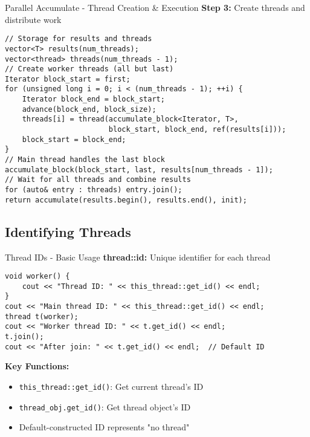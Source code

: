 \begin{frame}[fragile]{Parallel Accumulate - Thread Creation \& Execution}
	\textbf{Step 3:} Create threads and distribute work

	\begin{verbatim}
// Storage for results and threads
vector<T> results(num_threads);
vector<thread> threads(num_threads - 1);
// Create worker threads (all but last)
Iterator block_start = first;
for (unsigned long i = 0; i < (num_threads - 1); ++i) {
    Iterator block_end = block_start;
    advance(block_end, block_size);
    threads[i] = thread(accumulate_block<Iterator, T>,
                        block_start, block_end, ref(results[i]));
    block_start = block_end;
}
// Main thread handles the last block
accumulate_block(block_start, last, results[num_threads - 1]);
// Wait for all threads and combine results
for (auto& entry : threads) entry.join();
return accumulate(results.begin(), results.end(), init);
	\end{verbatim}
\end{frame}

\subsection{Identifying Threads}

\begin{frame}[fragile]{Thread IDs - Basic Usage}
	\textbf{thread::id:} Unique identifier for each thread

	\begin{verbatim}
void worker() {
    cout << "Thread ID: " << this_thread::get_id() << endl;
}
cout << "Main thread ID: " << this_thread::get_id() << endl;
thread t(worker);
cout << "Worker thread ID: " << t.get_id() << endl;
t.join();
cout << "After join: " << t.get_id() << endl;  // Default ID
	\end{verbatim}

	\textbf{Key Functions:}
	\begin{itemize}
		\item \texttt{this\_thread::get\_id()}: Get current thread's ID
		\item \texttt{thread\_obj.get\_id()}: Get thread object's ID
		\item Default-constructed ID represents "no thread"
	\end{itemize}
\end{frame}

